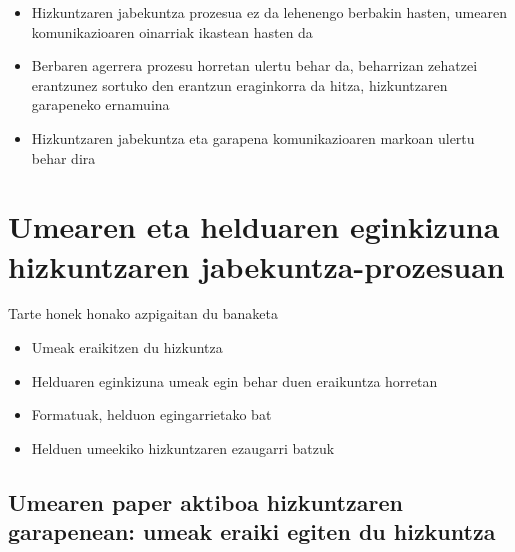 \documentclass[
]{book}
\providecommand{\tightlist}{%
  \setlength{\itemsep}{0pt}\setlength{\parskip}{0pt}}
\begin{document}
\begin{itemize}
\tightlist
\item
  Hizkuntzaren jabekuntza prozesua ez da lehenengo berbakin hasten, umearen komunikazioaren oinarriak ikastean hasten da
\item
  Berbaren agerrera prozesu horretan ulertu behar da, beharrizan zehatzei erantzunez sortuko den erantzun eraginkorra da hitza, hizkuntzaren garapeneko ernamuina
\item
  Hizkuntzaren jabekuntza eta garapena komunikazioaren markoan ulertu behar dira
\end{itemize}

\hypertarget{umearen-eta-helduaren-eginkizuna-hizkuntzaren-jabekuntza-prozesuan}{%
\section{Umearen eta helduaren eginkizuna hizkuntzaren jabekuntza-prozesuan}\label{umearen-eta-helduaren-eginkizuna-hizkuntzaren-jabekuntza-prozesuan}}

Tarte honek honako azpigaitan du banaketa

\begin{itemize}
\tightlist
\item
  Umeak eraikitzen du hizkuntza
\item
  Helduaren eginkizuna umeak egin behar duen eraikuntza horretan
\item
  Formatuak, helduon egingarrietako bat
\item
  Helduen umeekiko hizkuntzaren ezaugarri batzuk
\end{itemize}

\hypertarget{umearen-paper-aktiboa-hizkuntzaren-garapenean-umeak-eraiki-egiten-du-hizkuntza}{%
\subsection{Umearen paper aktiboa hizkuntzaren garapenean: umeak eraiki egiten du hizkuntza}\label{umearen-paper-aktiboa-hizkuntzaren-garapenean-umeak-eraiki-egiten-du-hizkuntza}}
\end{document}
